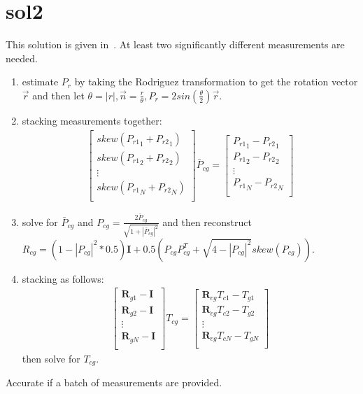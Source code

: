 \section{sol2}
This solution is given in~\cite{tsai1989new}. At least two significantly different measurements are needed.
\begin{enumerate}
\item estimate $P_r$ by taking the Rodriguez transformation to get the rotation vector $\vec{r}$ and then let $\theta=|r|, \vec{n}=\frac{r}{\theta}, P_r=2sin(\frac{\theta}{2})\vec{r}$.
\item stacking measurements together:
	\begin{align*}
		\left[
		\begin{matrix}
			skew({P_{r1}}_1+{P_{r2}}_1) \\
			skew({P_{r1}}_2+{P_{r2}}_2) \\
			\vdots \\
			skew({P_{r1}}_N+{P_{r2}}_N) \\
		\end{matrix}
		\right]\bar{P}_{cg} = \left[
		\begin{matrix}
		{P_{r1}}_1-{P_{r2}}_1 \\
		{P_{r1}}_2-{P_{r2}}_2 \\
		\vdots \\
		{P_{r1}}_N-{P_{r2}}_N \\
		\end{matrix}
		\right]
	\end{align*}
\item solve for $\bar{P}_{cg}$ and $P_{cg}=\frac{2\bar{P}_{cg}}{\sqrt{1+|\bar{P}_{cg}|^2}}$ and then reconstruct $R_{cg}=(1-|P_{cg}|^2*0.5)\mathbf{I}+0.5(P_{cg}P_{cg}^T+\sqrt{4-|P_{cg}|^2}skew(P_{cg}))$.
\item stacking as follows:
	\begin{align*}
		\left[
		\begin{matrix}
			\mathbf{R}_{g1}-\mathbf{I} \\
			\mathbf{R}_{g2}-\mathbf{I} \\
			\vdots \\
			\mathbf{R}_{gN}-\mathbf{I} \\
		\end{matrix}
		\right]{T}_{cg} = \left[
		\begin{matrix}
		\mathbf{R}_{cg}T_{c1}-T_{g1} \\ 
		\mathbf{R}_{cg}T_{c2}-T_{g2} \\ 
		\vdots \\
		\mathbf{R}_{cg}T_{cN}-T_{gN} \\ 
		\end{matrix}
		\right]
	\end{align*}
	then solve for $T_{cg}$.
\end{enumerate}
Accurate if a batch of measurements are provided.

